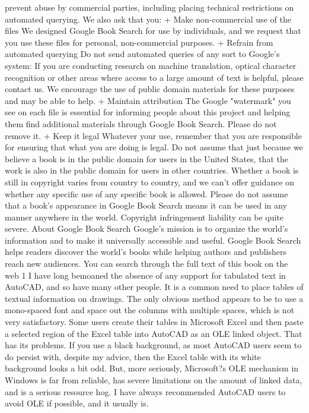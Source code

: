 \documentclass[a4paper]{article}
\begin{document}
{prevent abuse by commercial parties, including placing technical restrictions on automated querying. 
We also ask that you: 
+ Make non-commercial use of the files We designed Google Book Search for use by individuals, and we request that you use these files for 
personal, non-commercial purposes. 
+ Refrain from automated querying Do not send automated queries of any sort to Google's system: If you are conducting research on machine 
translation, optical character recognition or other areas where access to a large amount of text is helpful, please contact us. We encourage the 
use of public domain materials for these purposes and may be able to help. 
+ Maintain attribution The Google "watermark" you see on each file is essential for informing people about this project and helping them find 
additional materials through Google Book Search. Please do not remove it. 
+ Keep it legal Whatever your use, remember that you are responsible for ensuring that what you are doing is legal. Do not assume that just 
because we believe a book is in the public domain for users in the United States, that the work is also in the public domain for users in other 
countries. Whether a book is still in copyright varies from country to country, and we can't offer guidance on whether any specific use of 
any specific book is allowed. Please do not assume that a book's appearance in Google Book Search means it can be used in any manner 
anywhere in the world. Copyright infringement liability can be quite severe. 
About Google Book Search 
Google's mission is to organize the world's information and to make it universally accessible and useful. Google Book Search helps readers 
discover the world's books while helping authors and publishers reach new audiences. You can search through the full text of this book on the web 1
I have long bemoaned the absence of any support for tabulated text in AutoCAD, and so have many other people. It is a common need to place tables of textual information on drawings. The only obvious method appears to be to use a mono-spaced font and space out the columns with multiple spaces, which is not very satisfactory.
Some users create their tables in Microsoft Excel and then paste a selected region of the Excel table into AutoCAD as an OLE linked object. That has its problems. If you use a black background, as most AutoCAD users seem to do persist with, despite my advice, then the Excel table with its white background looks a bit odd. But, more seriously, Microsoft?s OLE mechanism in Windows is far from reliable, has severe limitations on the amount of linked data, and is a serious resource hog. I have always recommended AutoCAD users to avoid OLE if possible, and it usually is.
}
\end{document}
